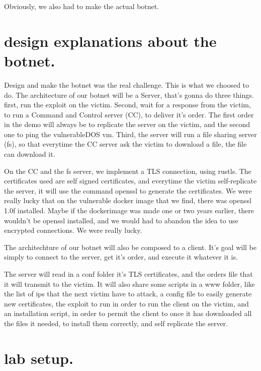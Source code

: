 \documentclass[../main.tex]{subfiles}
\begin{document}
    Obviously, we also had to make the actual botnet.

    \vspace{10pt}

    \section{design explanations about the botnet.}

    Design and make the botnet was the real challenge. 
    This is what we choosed to do.
    The architecture of our botnet will be a Server, that's gonna do three things.
    first, run the exploit on the victim.
    Second, wait for a response from the victim, to run a Command and Control server (CC), to deliver it's order.
    The first order in the demo will always be to replicate the server on the victim, and the second one to ping the vulnerableDOS vm.
    Third, the server will run a file sharing server (fs), so that everytime the CC server ask the victim to download a file, the file can download it.

    On the CC and the fs server, we implement a TLS connection, using rustls. 
    The certificates used are self signed certificates, and everytime the victim self-replicate the server, it will use the command openssl to generate the certificates.
    We were really lucky that on the vulnerable docker image that we find, there was openssl 1.0f installed. 
    Maybe if the dockerimage was made one or two years earlier, there wouldn't be openssl installed, and we would had to abandon the idea to use encrypted connections.
    We were really lucky.

    The architechture of our botnet will also be composed to a client.
    It's goal will be simply to connect to the server, get it's order, and execute it whatever it is.

    The server will read in a conf folder it's TLS certificates, and the orders file that it will transmit to the victim.
    It will also share some scripts in a www folder, like the list of ips that the next victim have to attack, a config file to easily generate new certificates, the exploit to run in order to run the client on the victim, and an installation script, in order to permit the client to once it has downloaded all the files it needed, to install them correctly, and self replicate the server.

    \vspace{10pt}

    \section{lab setup.}
\end{document}

